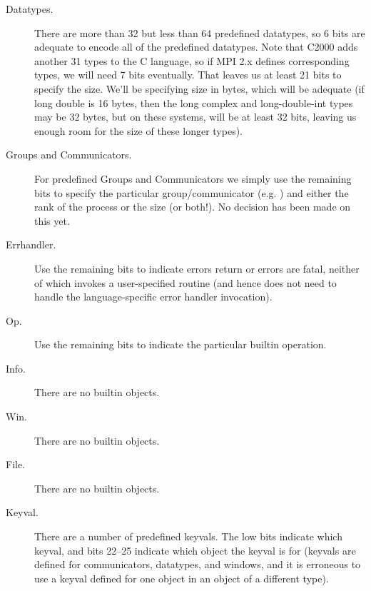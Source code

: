 \documentclass{article}
\begin{document}
\begin{description}
\item[Datatypes.]
There are more than 32 but less than 64 predefined datatypes, so 6 bits are
adequate to encode all of the predefined datatypes.
Note that C2000 adds another 31 types to the C language, so if MPI 2.x
defines corresponding types, we will need 7 bits eventually.
That leaves us at least 21 bits
to specify the size.  We'll be specifying size in bytes,
which will be adequate (if long double is 16 bytes, then the long complex and
long-double-int types may be 32 bytes, but on these systems,
 will
be at least 32 bits, leaving us enough room for the size of these longer
types). 

\item[Groups and Communicators.]
For predefined Groups and Communicators we simply use the remaining bits
to specify the particular group/communicator (e.g. ) and 
either the rank of the process or the size (or both!).  No decision
has been made on this yet.


\item[Errhandler.] Use the remaining bits to indicate errors return or
errors are fatal, neither of which invokes a user-specified routine
(and hence does not need to handle the language-specific error handler
invocation).

\item[Op.] Use the remaining bits to indicate the particular builtin operation.

\item[Info.] There are no builtin  objects.
\item[Win.] There are no builtin  objects.
\item[File.] There are no builtin  objects.
\item[Keyval.] There are a number of predefined keyvals.  The low bits
  indicate which keyval, and bits 22--25 indicate which object the
  keyval is for (keyvals are defined for communicators, datatypes, and
  windows, and it is erroneous to use a keyval defined for one object
  in an object of a different type).
\end{description}
\end{document}
